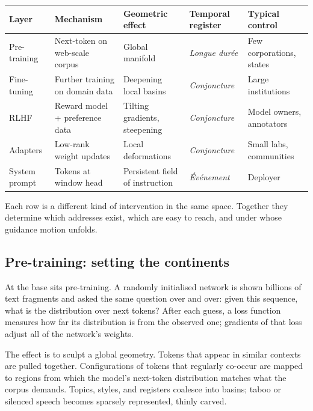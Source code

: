 \documentclass[12pt,a4paper]{article}
\begin{document}
\begin{formalbox}[title={Layers of fabrication}]
\begin{tabular}{@{}lllll@{}}
\toprule
\textbf{Layer} & \textbf{Mechanism} & \textbf{Geometric effect} & \textbf{Temporal register} & \textbf{Typical control} \\
\midrule
Pre-training   & Next-token on web-scale corpus & Global manifold                & \emph{Longue dur\'{e}e} & Few corporations, states \\
Fine-tuning    & Further training on domain data& Deepening local basins         & \emph{Conjoncture}      & Large institutions        \\
RLHF           & Reward model + preference data & Tilting gradients, steepening  & \emph{Conjoncture}      & Model owners, annotators  \\
Adapters       & Low-rank weight updates        & Local deformations             & \emph{Conjoncture}      & Small labs, communities   \\
System prompt  & Tokens at window head          & Persistent field of instruction& \emph{\'{E}v\'{e}nement} & Deployer                  \\
\bottomrule
\end{tabular}
\end{formalbox}

Each row is a different kind of intervention in the same space. Together they determine which addresses exist, which are easy to reach, and under whose guidance motion unfolds.

\subsection*{Pre-training: setting the continents}

At the base sits pre-training. A randomly initialised network is shown billions of text fragments and asked the same question over and over: given this sequence, what is the distribution over next tokens? After each guess, a loss function measures how far its distribution is from the observed one; gradients of that loss adjust all of the network's weights.

The effect is to sculpt a global geometry. Tokens that appear in similar contexts are pulled together. Configurations of tokens that regularly co-occur are mapped to regions from which the model's next-token distribution matches what the corpus demands. Topics, styles, and registers coalesce into basins; taboo or silenced speech becomes sparsely represented, thinly carved.
\end{document}
